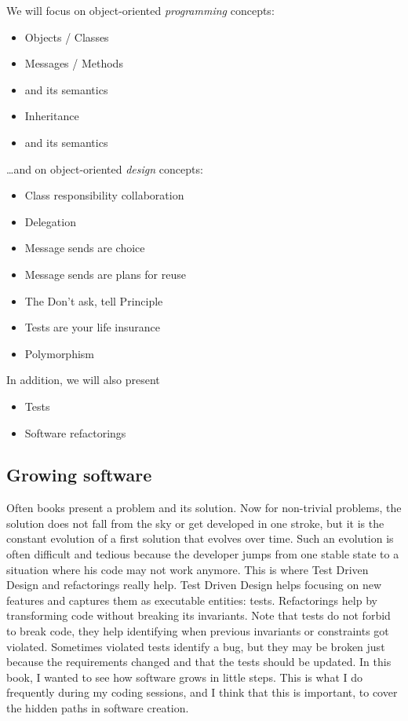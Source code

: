 \documentclass[10pt,twoside,english]{_support/latex/sbabook/sbabook}
\begin{document}
We will focus on object-oriented \textit{programming} concepts:

\begin{itemize}
\item Objects / Classes 
\item Messages / Methods
\item {} and its semantics
\item Inheritance
\item {} and its semantics
\end{itemize}

…and on object-oriented \textit{design} concepts:

\begin{itemize}
\item Class responsibility collaboration
\item Delegation
\item Message sends are choice
\item Message sends are plans for reuse
\item The Don't ask, tell Principle
\item Tests are your life insurance
\item Polymorphism
\end{itemize}

In addition, we will also present 

\begin{itemize}
\item Tests
\item Software refactorings
\end{itemize}
\subsection{Growing software}
Often books present a problem and its solution. Now for non-trivial problems, the solution does not fall from the sky or get developed in one stroke, but it is the constant evolution of a first solution that evolves over time. Such an evolution is often difficult and tedious because the developer jumps from one stable state to a situation where his code may not work anymore. This is where Test Driven Design and refactorings really help.
Test Driven Design helps focusing on new features and captures them as executable entities: tests. Refactorings help by transforming code without breaking its invariants.
Note that tests do not forbid to break code, they help identifying when previous invariants or constraints got violated. Sometimes violated tests identify a bug, but they may be broken just because the requirements changed and that the tests should be updated. 
In this book, I wanted to see how software grows in little steps. This is what I do frequently during my coding sessions, and I think that this is important, to cover the hidden paths in software creation.
\end{document}
